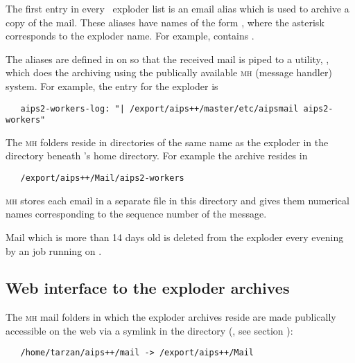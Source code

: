 The first entry in every \aipspp\ exploder list is an email alias which is
used to archive a copy of the mail.  These aliases have names of the form
, where the asterisk corresponds to the exploder name.  For
example, \mbox{} contains
\mbox{}.

The  aliases are defined in  on
 so that the received mail is piped to a utility,
, which does the archiving using the publically available
\textsc{mh} (message handler) system.  For example, the entry for the
\mbox{} exploder is

\begin{verbatim}
   aips2-workers-log: "| /export/aips++/master/etc/aipsmail aips2-workers"
\end{verbatim}

\noindent
The \textsc{mh} folders reside in directories of the same name as the exploder
in the  directory beneath 's home directory.  For
example the \mbox{} archive resides in

\begin{verbatim}
   /export/aips++/Mail/aips2-workers
\end{verbatim}

\noindent
\textsc{mh} stores each email in a separate file in this directory and gives
them numerical names corresponding to the sequence number of the message.

Mail which is more than 14 days old is deleted from the
\mbox{} exploder every evening by an 
 job running on .

\subsection*{Web interface to the exploder archives}


The \textsc{mh} mail folders in which the exploder archives reside are made
publically accessible on the web via a symlink in the 
 directory (, see section
):

\begin{verbatim}
   /home/tarzan/aips++/mail -> /export/aips++/Mail
\end{verbatim}

